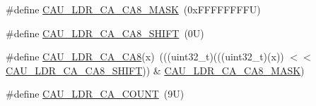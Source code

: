 \begin{DoxyCompactItemize}
\item 
\#define \mbox{\hyperlink{group___c_a_u___register___masks_ga85639a056055e9b13bd051f13fa061f8}{C\+A\+U\+\_\+\+L\+D\+R\+\_\+\+C\+A\+\_\+\+C\+A8\+\_\+\+M\+A\+SK}}~(0x\+F\+F\+F\+F\+F\+F\+F\+F\+U)
\item 
\#define \mbox{\hyperlink{group___c_a_u___register___masks_ga41f527c7bdb6b4b5502baa4d4dc79cbc}{C\+A\+U\+\_\+\+L\+D\+R\+\_\+\+C\+A\+\_\+\+C\+A8\+\_\+\+S\+H\+I\+FT}}~(0\+U)
\item 
\#define \mbox{\hyperlink{group___c_a_u___register___masks_ga2c7bb58b9c62ed37bc454b44f87e015c}{C\+A\+U\+\_\+\+L\+D\+R\+\_\+\+C\+A\+\_\+\+C\+A8}}(x)~(((uint32\+\_\+t)(((uint32\+\_\+t)(x)) $<$$<$ \mbox{\hyperlink{group___c_a_u___register___masks_ga41f527c7bdb6b4b5502baa4d4dc79cbc}{C\+A\+U\+\_\+\+L\+D\+R\+\_\+\+C\+A\+\_\+\+C\+A8\+\_\+\+S\+H\+I\+FT}})) \& \mbox{\hyperlink{group___c_a_u___register___masks_ga85639a056055e9b13bd051f13fa061f8}{C\+A\+U\+\_\+\+L\+D\+R\+\_\+\+C\+A\+\_\+\+C\+A8\+\_\+\+M\+A\+SK}})
\item 
\#define \mbox{\hyperlink{group___c_a_u___register___masks_gae9d036d524ff726000428c6ebae38af3}{C\+A\+U\+\_\+\+L\+D\+R\+\_\+\+C\+A\+\_\+\+C\+O\+U\+NT}}~(9\+U)
\end{DoxyCompactItemize}
